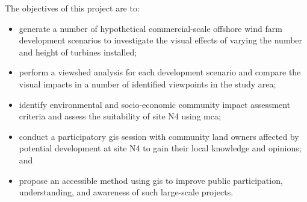 The objectives of this project are to:

\begin{itemize}[noitemsep]
  \item generate a number of hypothetical commercial-scale offshore wind farm development scenarios to investigate the visual effects of varying the number and height of turbines installed;
  \item perform a viewshed analysis for each development scenario and compare the visual impacts in a number of identified viewpoints in the study area;
  \item identify environmental and socio-economic community impact assessment criteria and assess the suitability of site N4 using \gls{mca};
  \item conduct a participatory \gls{gis} session with community land owners affected by potential development at site N4 to gain their local knowledge and opinions; and
  \item propose an accessible method using \gls{gis} to improve public participation, understanding, and awareness of such large-scale projects.
\end{itemize}
